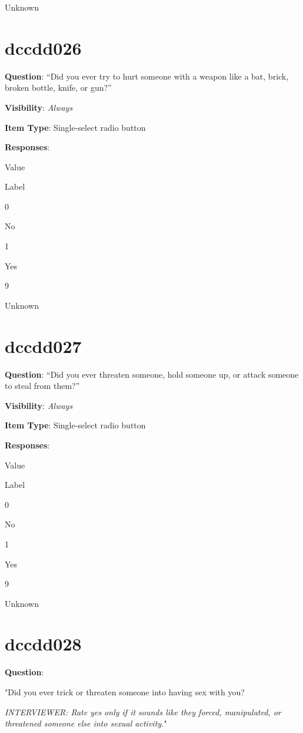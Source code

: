 \documentclass[]{book}
\begin{document}
Unknown

\hypertarget{dccdd026}{%
\section{dccdd026}\label{dccdd026}}

\textbf{Question}: ``Did you ever try to hurt someone with a weapon like a bat, brick, broken bottle, knife, or gun?''

\textbf{Visibility}: \emph{Always}

\textbf{Item Type}: Single-select radio button

\textbf{Responses}:

Value

Label

0

No

1

Yes

9

Unknown

\hypertarget{dccdd027}{%
\section{dccdd027}\label{dccdd027}}

\textbf{Question}: ``Did you ever threaten someone, hold someone up, or attack someone to steal from them?''

\textbf{Visibility}: \emph{Always}

\textbf{Item Type}: Single-select radio button

\textbf{Responses}:

Value

Label

0

No

1

Yes

9

Unknown

\hypertarget{dccdd028}{%
\section{dccdd028}\label{dccdd028}}

\textbf{Question}:

"Did you ever trick or threaten someone into having sex with you?

\emph{INTERVIEWER: Rate yes only if it sounds like they forced, manipulated, or threatened someone else into sexual activity.}"
\end{document}
